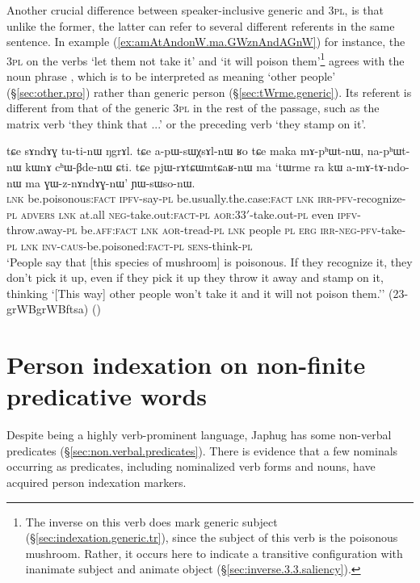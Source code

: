 Another crucial difference between speaker-inclusive generic and \textsc{3pl}, is that unlike the former, the latter can refer to several different referents in the same sentence. In example (\ref{ex:amAtAndonW.ma.GWznAndAGnW}) for instance, the \textsc{3pl} on the verbs  `let them not take it' and  `it will poison them'\footnote{The inverse on this verb does mark generic subject (§\ref{sec:indexation.generic.tr}), since the subject of this verb is the poisonous mushroom. Rather, it occurs here to indicate a transitive configuration with inanimate subject and animate object (§\ref{sec:inverse.3.3.saliency}).} agrees with the noun phrase , which is to be interpreted as meaning `other people' (§\ref{sec:other.pro}) rather than generic person (§\ref{sec:tWrme.generic}). Its referent is different from that of the generic \textsc{3pl} in the rest of the passage, such as the matrix verb  `they think that ...' or the preceding verb  `they stamp on it'.

\begin{exe}
\ex \label{ex:amAtAndonW.ma.GWznAndAGnW}
\gll tɕe sɤndɤɣ tu-ti-nɯ ŋgrɤl. tɕe a-pɯ-sɯχsɤl-nɯ ʁo tɕe maka mɤ-pʰɯt-nɯ, na-pʰɯt-nɯ kɯnɤ cʰɯ-βde-nɯ ɕti. tɕe pjɯ-rɤtɕɯmtɕaʁ-nɯ ma `tɯrme ra kɯ a-mɤ-tɤ-ndo-nɯ ma ɣɯ-z-nɤndɤɣ-nɯ' ɲɯ-sɯso-nɯ. \\
\textsc{lnk} be.poisonous:\textsc{fact} \textsc{ipfv}-say-\textsc{pl} be.usually.the.case:\textsc{fact} \textsc{lnk} \textsc{irr}-\textsc{pfv}-recognize-\textsc{pl} \textsc{advers} \textsc{lnk} at.all \textsc{neg}-take.out:\textsc{fact}-\textsc{pl} \textsc{aor}:3\fl{}3$'$-take.out-\textsc{pl} even \textsc{ipfv}-throw.away-\textsc{pl} be.\textsc{aff}:\textsc{fact} \textsc{lnk} \textsc{aor}-tread-\textsc{pl} \textsc{lnk} people \textsc{pl} \textsc{erg} \textsc{irr}-\textsc{neg}-\textsc{pfv}-take-\textsc{pl} \textsc{lnk} \textsc{inv}-\textsc{caus}-be.poisoned:\textsc{fact}-\textsc{pl} \textsc{sens}-think-\textsc{pl} \\
\glt `People say that [this species of mushroom] is poisonous. If they recognize it, they don't pick it up, even if they pick it up they throw it away and stamp on it, thinking `[This way] other people won't take it and it will not poison them.'' (23-grWBgrWBftsa)
()
\end{exe}

\section{Person indexation on non-finite predicative words} \label{sec:non.finite.indexation}
Despite being a highly verb-prominent language, Japhug has some non-verbal predicates (§\ref{sec:non.verbal.predicates}). There is evidence that a few nominals occurring as predicates, including nominalized verb forms and nouns, have acquired person indexation markers.

